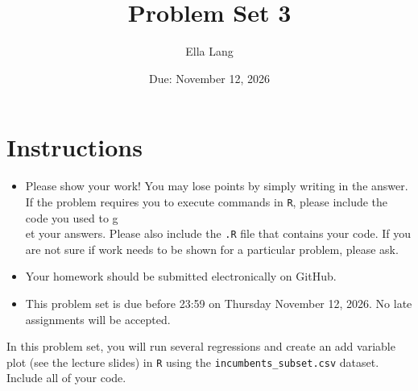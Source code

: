 \documentclass[12pt,letterpaper]{article}
\title{Problem Set 3}
\date{Due: November 12, 2026}
\author{Ella Lang}
\begin{document}
	\maketitle
	\section*{Instructions}
	\begin{itemize}
		\item Please show your work! You may lose points by simply writing in the answer. If the problem requires you to execute commands in \texttt{R}, please include the code you used to g\\
		et your answers. Please also include the \texttt{.R} file that contains your code. If you are not sure if work needs to be shown for a particular problem, please ask.
	\item Your homework should be submitted electronically on GitHub.
	\item This problem set is due before 23:59 on Thursday November 12, 2026. No late assignments will be accepted.

	\end{itemize}

		\vspace{.25cm}
	
\noindent In this problem set, you will run several regressions and create an add variable plot (see the lecture slides) in \texttt{R} using the \texttt{incumbents\_subset.csv} dataset. Include all of your code.

	\vspace{.5cm}
\end{document}
